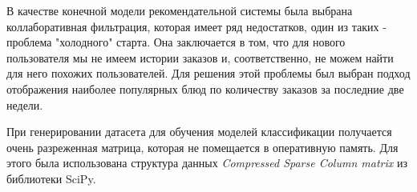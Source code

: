 В качестве конечной модели рекомендательной системы была выбрана коллаборативная
фильтрация, которая имеет ряд недостатков, один из таких - проблема "холодного"
старта. Она заключается в том, что для нового пользователя мы не имеем истории заказов
и, соответственно, не можем найти для него похожих пользователей. Для решения этой
проблемы был выбран подход отображения наиболее популярных блюд по количеству заказов
за последние две недели.

При генерировании датасета для обучения моделей классификации получается очень
разреженная матрица, которая не помещается в оперативную память. Для этого была
использована структура данных \textit{Compressed Sparse Column matrix} \cite{CSCMatrix} из
библиотеки SciPy.
